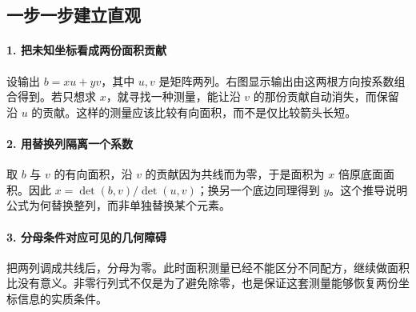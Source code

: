 \subsection*{一步一步建立直观}

\paragraph{1. 把未知坐标看成两份面积贡献}

设输出 $b=xu+yv$，其中 $u,v$ 是矩阵两列。右图显示输出由这两根方向按系数组合得到。若只想求 $x$，就寻找一种测量，能让沿 $v$ 的那份贡献自动消失，而保留沿 $u$ 的贡献。这样的测量应该比较有向面积，而不是仅比较箭头长短。



\paragraph{2. 用替换列隔离一个系数}

取 $b$ 与 $v$ 的有向面积，沿 $v$ 的贡献因为共线而为零，于是面积为 $x$ 倍原底面面积。因此 $x=\det(b,v)/\det(u,v)$；换另一个底边同理得到 $y$。这个推导说明公式为何替换整列，而非单独替换某个元素。



\paragraph{3. 分母条件对应可见的几何障碍}

把两列调成共线后，分母为零。此时面积测量已经不能区分不同配方，继续做面积比没有意义。非零行列式不仅是为了避免除零，也是保证这套测量能够恢复两份坐标信息的实质条件。
